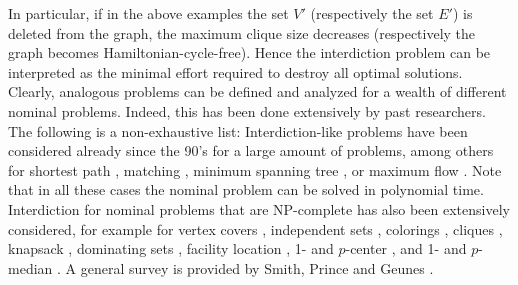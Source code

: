 In particular, if in the above examples the set $V'$ (respectively the set $E'$) is deleted from the graph, 
the maximum clique size decreases (respectively the graph becomes Hamiltonian-cycle-free). 
Hence the interdiction problem can be interpreted as the minimal effort required to destroy all optimal solutions.
Clearly, analogous problems can be defined and analyzed for a wealth of different nominal problems. Indeed, this has been done extensively by past researchers. 
The following is a non-exhaustive list:
Interdiction-like problems have been considered already since the 90's for a large amount of problems, among others for
shortest path \cite{bar1998complexity,DBLP:journals/mst/KhachiyanBBEGRZ08,malik1989k},
matching \cite{DBLP:journals/dam/Zenklusen10a},
minimum spanning tree \cite{DBLP:journals/ipl/LinC93},
or maximum flow \cite{WOOD19931}.
Note that in all these cases the nominal problem can be solved in polynomial time. Interdiction for nominal problems that are NP-complete has also been extensively considered, for example for
vertex covers \cite{DBLP:conf/iwoca/BazganTT10, DBLP:journals/dam/BazganTT11},
independent sets \cite{DBLP:journals/gc/BazganBPR15,DBLP:conf/iwoca/BazganTT10, DBLP:journals/dam/BazganTT11,DBLP:journals/dam/HoangLW23, DBLP:conf/tamc/PaulusmaPR17},
colorings \cite{DBLP:journals/gc/BazganBPR15, DBLP:conf/iscopt/PaulusmaPR16, DBLP:conf/tamc/PaulusmaPR17},
cliques \cite{DBLP:journals/eor/FuriniLMS19, DBLP:journals/anor/Pajouh20, DBLP:journals/networks/PajouhBP14,DBLP:conf/iscopt/PaulusmaPR16},
knapsack \cite{weninger2024fast,DBLP:conf/ipco/CapraraCLW13},
dominating sets \cite{DBLP:journals/eor/PajouhWBP15},
facility location \cite{DBLP:journals/tcs/FrohlichR21},
1- and $p$-center \cite{DBLP:conf/cocoa/BazganTV10, DBLP:journals/jco/BazganTV13}, and
1- and $p$-median \cite{DBLP:conf/cocoa/BazganTV10, DBLP:journals/jco/BazganTV13}.
A general survey is provided by Smith, Prince and Geunes \cite{smith2013modern}.

